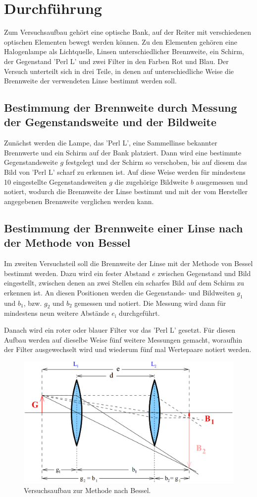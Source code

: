 \section{Durchführung}
Zum Versuchsaufbau gehört eine optische Bank, auf der Reiter mit verschiedenen optischen Elementen bewegt werden können. Zu den Elementen gehören eine Halogenlampe als Lichtquelle, Linsen unterschiedlicher Brennweite, ein Schirm,
der Gegenstand 'Perl L' und zwei Filter in den Farben Rot und Blau. Der Versuch unterteilt sich in drei Teile, in denen auf unterschiedliche Weise die Brennweite der verwendeten Linse bestimmt werden soll.

\subsection{Bestimmung der Brennweite durch Messung der Gegenstandsweite und der Bildweite}
Zunächst werden die Lampe, das 'Perl L', eine Sammellinse bekannter Brennwerte und ein Schirm auf der Bank platziert. Dann wird eine bestimmte Gegenstandsweite $g$ festgelegt und der Schirm so verschoben, bis auf diesem das 
Bild von 'Perl L' scharf zu erkennen ist. Auf diese Weise werden für mindestens 10 eingestellte Gegenstandsweiten $g$ die zugehörige Bildweite $b$ ausgemessen und notiert, wodurch die Brennweite der Linse bestimmt und mit der
vom Hersteller angegebenen Brennweite verglichen werden kann.


\subsection{Bestimmung der Brennweite einer Linse nach der Methode von Bessel}
Im zweiten Versuchsteil soll die Brennweite der Linse mit der Methode von Bessel bestimmt werden. Dazu wird ein fester Abstand $e$ zwischen Gegenstand und Bild eingestellt, zwischen denen an zwei Stellen ein scharfes Bild auf dem 
Schirm zu erkennen ist. An diesen Positionen werden die Gegenstands- und Bildweiten $g_1$ und $b_1$, bzw. $g_2$ und $b_2$ gemessen und notiert. Die Messung wird dann für mindestens neun weitere Abstände $e_{\text{i}}$ durchgeführt.

Danach wird ein roter oder blauer Filter vor das 'Perl L' gesetzt. Für diesen Aufbau werden auf dieselbe Weise fünf weitere Messungen gemacht, woraufhin der Filter ausgewechselt wird und wiederum fünf mal Wertepaare notiert werden.

\begin{figure}[h!tbp]
	\centering
	\includegraphics[width=0.6\linewidth]{aufbau1.png}
	\caption{Versuchsaufbau zur Methode nach Bessel.\cite[4]{anleitung408}}
	\label{fig:aufbau1}
\end{figure}


